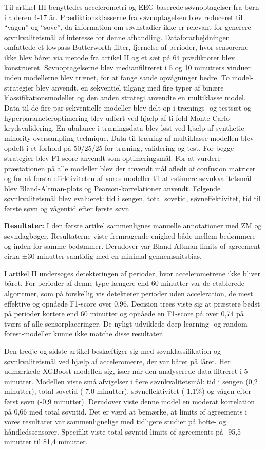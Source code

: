\documentclass[
  10pt,
]{scrbook}
\let\originaltextbf\textbf
\renewcommand{\textbf}[1]{\textcolor{color1}{\originaltextbf{#1}}}
\begin{document}
Til artikel III benyttedes accelerometri og EEG-baserede søvnoptagelser
fra børn i alderen 4-17 år. Prædiktionsklasserne fra søvnoptagelsen blev
reduceret til ``vågen'' og ``sove'', da information om søvnstadier ikke
er relevant for generere søvnkvalitetsmål af interesse for denne
afhandling. Dataforarbejdningen omfattede et lowpass Butterworth-filter,
fjernelse af perioder, hvor sensorerne ikke blev båret via metode fra
artikel II og et sæt på 64 prædiktorer blev konstrueret.
Søvnoptagelserne blev medianfiltreret i 5 og 10 minutters vinduer inden
modellerne blev trænet, for at fange sande opvågninger bedre. To
model-strategier blev anvendt, en sekventiel tilgang med fire typer af
binære klassifikationsmodeller og den anden strategi anvendte en
multiklasse model. Data til de fire par sekventielle modeller blev delt
op i trænings- og testsæt og hyperparameteroptimering blev udført ved
hjælp af ti-fold Monte Carlo krydsvalidering. En ubalance i træningsdata
blev løst ved hjælp af synthetic minority oversampling technique. Data
til træning af multiklasse-modellen blev opdelt i et forhold på 50/25/25
for træning, validering og test. For begge strategier blev F1 score
anvendt som optimeringsmål. For at vurdere præstationen på alle modeller
blev der anvendt mål afledt af confusion matricer og for at forstå
effektiviteten af vores modeller til at estimere søvnkvalitetsmål blev
Bland-Altman-plots og Pearson-korrelationer anvendt. Følgende
søvnkvalitetsmål blev evalueret: tid i sengen, total sovetid,
søvneffektivitet, tid til første søvn og vågentid efter første søvn.

\textbf{Resultater:} I den første artikel sammenlignes manuelle
annotationer med ZM og søvndagbøger. Resultaterne viste fremragende
enighed både mellem bedømmere og inden for samme bedømmer. Derudover var
Bland-Altman limits of agreement cirka ±30 minutter samtidig med en
minimal gennemsnitsbias.

I artikel II undersøges detekteringen af perioder, hvor accelerometrene
ikke bliver båret. For perioder af denne type længere end 60 minutter
var de etablerede algoritmer, som på forskellig vis detekterer perioder
uden acceleration, de mest effektive og opnåede F1-score over 0,96.
Decision trees viste sig at præstere bedst på perioder kortere end 60
minutter og opnåede en F1-score på over 0,74 på tværs af alle
sensorplaceringer. De nyligt udviklede deep learning- og random
forest-modeller kunne ikke matche disse resultater.

Den tredje og sidste artikel beskæftiger sig med søvnklassifikation og
søvnkvalitetsmål ved hjælp af accelerometre, der var båret på låret. Her
udmærkede XGBoost-modellen sig, især når den analyserede data filtreret
i 5 minutter. Modellen viste små afvigelser i flere søvnkvalitetsmål:
tid i sengen (0,2 minutter), total sovetid (-7,0 minutter),
søvneffektivitet (-1,1\%) og vågen efter først søvn (-0,9 minutter).
Derudover viste denne model en moderat korrelation på 0,66 med total
søvntid. Det er værd at bemærke, at limits of agreements i vores
resultater var sammenlignelige med tidligere studier på hofte- og
håndledssensorer. Specifikt viste total søvntid limits of agreements på
-95,5 minutter til 81,4 minutter.
\end{document}

